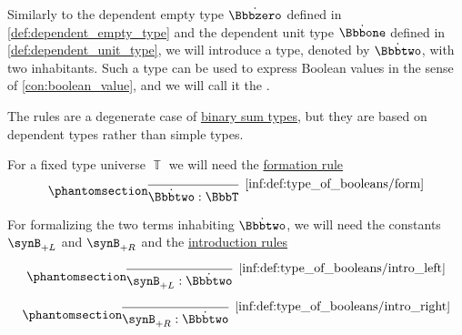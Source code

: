 \begin{definition}\label{def:type_of_booleans}
  Similarly to the dependent empty type \( \syn\Bbbzero \) defined in \cref{def:dependent_empty_type} and the dependent unit type \( \syn\Bbbone \) defined in \cref{def:dependent_unit_type}, we will introduce a type, denoted by \( \syn\Bbbtwo \), with two inhabitants. Such a type can be used to express Boolean values in the sense of \cref{con:boolean_value}, and we will call it the .

  The rules are a degenerate case of \hyperref[def:simple_sum_type]{binary sum types}, but they are based on dependent types rather than simple types.

  For a fixed type universe \( \BbbT \) we will need the \hyperref[rem:type_theory_rule_classification/form]{formation rule}
  \begin{equation*}\taglabel[\ensuremath{ \Bbbtwo_{\logic{form}} }]{inf:def:type_of_booleans/form}
    \begin{prooftree}
      \infer0[\ref{inf:def:type_of_booleans/form}]{ \syn\Bbbtwo: \BbbT }
    \end{prooftree}
  \end{equation*}

  For formalizing the two terms inhabiting \( \syn\Bbbtwo \), we will need the constants \( \synB_{+L} \) and \( \synB_{+R} \) and the \hyperref[rem:type_theory_rule_classification/intro]{introduction rules}
  \begin{paracol}{2}
    \begin{leftcolumn}
      \ParacolAlignmentHack
      \begin{equation*}\taglabel[\ensuremath{ \Bbbtwo_{+L} }]{inf:def:type_of_booleans/intro_left}
        \begin{prooftree}
          \infer0[\ref{inf:def:type_of_booleans/intro_left}]{ \synB_{+L}: \syn\Bbbtwo }
        \end{prooftree}
      \end{equation*}
    \end{leftcolumn}

    \begin{rightcolumn}
      \ParacolAlignmentHack
      \begin{equation*}\taglabel[\ensuremath{ \Bbbtwo_{+R} }]{inf:def:type_of_booleans/intro_right}
        \begin{prooftree}
          \infer0[\ref{inf:def:type_of_booleans/intro_right}]{ \synB_{+R}: \syn\Bbbtwo }
        \end{prooftree}
      \end{equation*}
    \end{rightcolumn}
  \end{paracol}


\end{definition}
